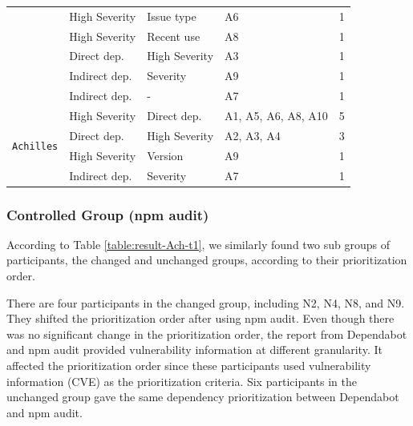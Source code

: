 \documentclass[conference]{IEEEtran}
\begin{document}
\begin{table}[tb]
{\begin{tabular}{cp{2cm}p{2cm}p{1.5cm}r}
				& High Severity & Issue type                      & A6                                            & 1               \\ 
				& High Severity & Recent use                      & A8                                            & 1               \\ 
				& Direct dep.  & High Severity                   & A3                                            & 1               \\ 
				& Indirect dep. & Severity                        & A9                                            & 1               \\ 
				& Indirect dep. & - & A7                                            & 1               \\ 
				\midrule
				\multirow{5}{*}{\texttt{Achilles}}  & High Severity & Direct dep.                          & A1, A5, A6, A8, A10                           & 5               \\ 
				& Direct dep.  & High Severity                   & A2, A3, A4 & 3               \\ 
				& High Severity & Version                         & A9                                            & 1               \\ 
				& Indirect dep. & Severity                        & A7                                            & 1               \\ 
				\bottomrule
			\end{tabular}
		}
		\label{table:prioritization_factor}
	\end{table}
	
	\subsubsection{Controlled Group (npm audit)}
	According to Table \ref{table:result-Ach-t1}, we similarly found two sub groups of participants, the changed and unchanged groups, according to their prioritization order.
	
	There are four participants in the changed group, including N2, N4, N8, and N9. They shifted the prioritization order after using npm audit. Even though there was no significant change in the prioritization order, the report from Dependabot and npm audit provided vulnerability information at different granularity. It affected the prioritization order since these participants used vulnerability information (CVE) as the prioritization criteria. Six participants in the unchanged group gave the same dependency prioritization between Dependabot and npm audit.
	
\end{document}
